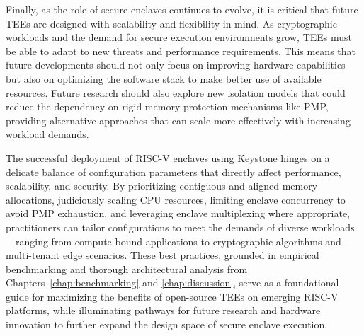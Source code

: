Finally, as the role of secure enclaves continues to evolve, it is critical that future TEEs are designed with scalability and flexibility in mind. As cryptographic workloads and the demand for secure execution environments grow, TEEs must be able to adapt to new threats and performance requirements. This means that future developments should not only focus on improving hardware capabilities but also on optimizing the software stack to make better use of available resources. Future research should also explore new isolation models that could reduce the dependency on rigid memory protection mechanisms like PMP, providing alternative approaches that can scale more effectively with increasing workload demands.

The successful deployment of RISC-V enclaves using Keystone hinges on a delicate balance of configuration parameters that directly affect performance, scalability, and security. By prioritizing contiguous and aligned memory allocations, judiciously scaling CPU resources, limiting enclave concurrency to avoid PMP exhaustion, and leveraging enclave multiplexing where appropriate, practitioners can tailor configurations to meet the demands of diverse workloads—ranging from compute-bound applications to cryptographic algorithms and multi-tenant edge scenarios. These best practices, grounded in empirical benchmarking and thorough architectural analysis from Chapters~\ref{chap:benchmarking} and \ref{chap:discussion}, serve as a foundational guide for maximizing the benefits of open-source TEEs on emerging RISC-V platforms, while illuminating pathways for future research and hardware innovation to further expand the design space of secure enclave execution.
